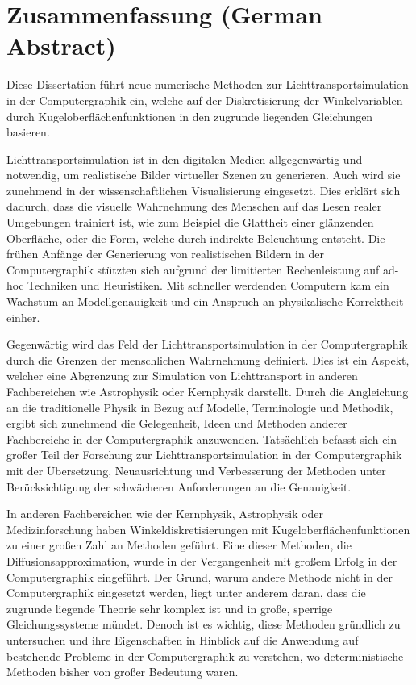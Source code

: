 %
\chapter*{Zusammenfassung (German Abstract)}
%
%
Diese Dissertation führt neue numerische Methoden zur Lichttransportsimulation in der Computergraphik ein, welche auf der Diskretisierung der Winkelvariablen durch Kugeloberflächenfunktionen in den zugrunde liegenden Gleichungen basieren.

Lichttransportsimulation ist in den digitalen Medien allgegenwärtig und notwendig, um realistische Bilder virtueller Szenen zu generieren. Auch wird sie zunehmend in der wissenschaftlichen Visualisierung eingesetzt. Dies erklärt sich dadurch, dass die visuelle Wahrnehmung des Menschen auf das Lesen realer Umgebungen trainiert ist, wie zum Beispiel die Glattheit einer glänzenden Oberfläche, oder die Form, welche durch indirekte Beleuchtung entsteht. Die frühen Anfänge der Generierung von realistischen Bildern in der Computergraphik stützten sich aufgrund der limitierten Rechenleistung auf ad-hoc Techniken und Heuristiken. Mit schneller werdenden Computern kam ein Wachstum an Modellgenauigkeit und ein Anspruch an physikalische Korrektheit einher.

Gegenwärtig wird das Feld der Lichttransportsimulation in der Computergraphik durch die Grenzen der menschlichen Wahrnehmung definiert. Dies ist ein Aspekt, welcher eine Abgrenzung zur Simulation von Lichttransport in anderen Fachbereichen wie Astrophysik oder Kernphysik darstellt. Durch die Angleichung an die traditionelle Physik in Bezug auf Modelle, Terminologie und Methodik, ergibt sich zunehmend die Gelegenheit, Ideen und Methoden anderer Fachbereiche in der Computergraphik anzuwenden. Tatsächlich befasst sich ein großer Teil der Forschung zur Lichttransportsimulation in der Computergraphik mit der Übersetzung, Neuausrichtung und Verbesserung der Methoden unter Berücksichtigung der schwächeren Anforderungen an die Genauigkeit.

In anderen Fachbereichen wie der Kernphysik, Astrophysik oder Medizinforschung haben Winkeldiskretisierungen mit Kugeloberflächenfunktionen zu einer großen Zahl an Methoden geführt. Eine dieser Methoden, die Diffusionsapproximation, wurde in der Vergangenheit mit großem Erfolg in der Computergraphik eingeführt. Der Grund, warum andere Methode nicht in der Computergraphik eingesetzt werden, liegt unter anderem daran, dass die zugrunde liegende Theorie sehr komplex ist und in große, sperrige Gleichungssysteme mündet. Denoch ist es wichtig, diese Methoden gründlich zu untersuchen und ihre Eigenschaften in Hinblick auf die Anwendung auf bestehende Probleme in der Computergraphik zu verstehen, wo deterministische Methoden bisher von großer Bedeutung waren.

